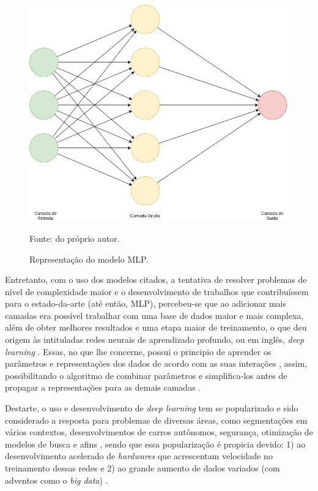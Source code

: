 \begin{figure}[H]
    \centering
    \caption{Representação do modelo MLP.}
    \includegraphics[width=1\linewidth]{recursos/imagens/deep/mlp.png}
    \label{deep:fig:4}

    \vspace*{1 cm}
    Fonte: do próprio autor.
\end{figure}

Entretanto, com o uso dos modelos citados, a tentativa de resolver problemas de nível de complexidade maior e o desenvolvimento de trabalhos que contribuíssem para o estado-da-arte (até então, MLP), percebeu-se que ao adicionar mais camadas era possível trabalhar com uma base de dados maior e mais complexa, além de obter melhores resultados e uma etapa maior de treinamento, o que deu origem às intituladas redes neurais de aprendizado profundo, ou em inglês, \textit{deep learning} \cite{Goodfellow2016}. Essas, no que lhe concerne, possui o principio de aprender os parâmetros e representações dos dados de acordo com as suas interações \cite{ponti2018funciona}, assim, possibilitando o algoritmo de combinar parâmetros e simplifica-los antes de propagar a representações para as demais camadas \cite{Goodfellow2016}.

Destarte, o uso e desenvolvimento de \textit{deep learning} tem se popularizado e sido considerado a resposta para problemas de diversas áreas, como segmentações em vários contextos, desenvolvimentos de carros autônomos, segurança, otimização de modelos de busca e afins \cite{Ghosh2019}, sendo que essa popularização é propicia devido: 1) ao desenvolvimento acelerado de \textit{hardwares} que acrescentam velocidade no treinamento dessas redes e 2) ao grande aumento de dados variados (com adventos como o \textit{big data}) \cite{Szegedy2015GoingConvolutions, ponti2018funciona}.

